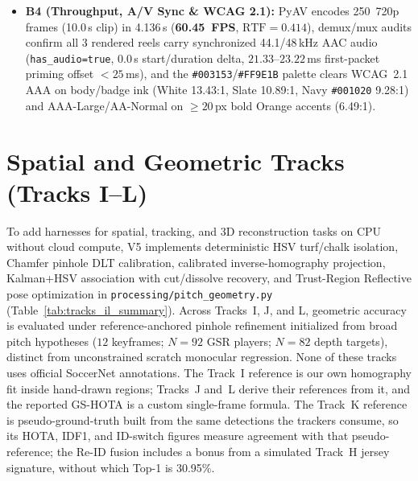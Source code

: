 \documentclass[10pt,twocolumn,letterpaper]{article}
\begin{document}
\begin{itemize}
    \item \textbf{B4 (Throughput, A/V Sync \& WCAG 2.1):} PyAV encodes 250~720p frames (10.0\,s clip) in 4.136\,s (\textbf{60.45~FPS}, $\text{RTF}=0.414$), demux/mux audits confirm all 3 rendered reels carry synchronized 44.1/48\,kHz AAC audio (\texttt{has\_audio=true}, $0.0$\,s start/duration delta, $21.33\text{--}23.22$\,ms first-packet priming offset $<25$\,ms), and the \texttt{\#003153}/\texttt{\#FF9E1B} palette clears WCAG~2.1 AAA on body/badge ink (White 13.43:1, Slate 10.89:1, Navy \texttt{\#001020} 9.28:1) and AAA-Large/AA-Normal on $\ge 20$\,px bold Orange accents (6.49:1).
\end{itemize}

\section{Spatial and Geometric Tracks (Tracks I--L)}
\label{sec:spatial_tracks}

To add harnesses for spatial, tracking, and 3D reconstruction tasks on CPU without cloud compute, V5 implements deterministic HSV turf/chalk isolation, Chamfer pinhole DLT calibration, calibrated inverse-homography projection, Kalman+HSV association with cut/dissolve recovery, and Trust-Region Reflective pose optimization in \texttt{processing/pitch\_geometry.py} (Table~\ref{tab:tracks_il_summary}). Across Tracks~I, J, and L, geometric accuracy is evaluated under reference-anchored pinhole refinement initialized from broad pitch hypotheses ($12$ keyframes; $N=92$ GSR players; $N=82$ depth targets), distinct from unconstrained scratch monocular regression. None of these tracks uses official SoccerNet annotations. The Track~I reference is our own homography fit inside hand-drawn regions; Tracks~J and~L derive their references from it, and the reported GS-HOTA is a custom single-frame formula. The Track~K reference is pseudo-ground-truth built from the same detections the trackers consume, so its HOTA, IDF1, and ID-switch figures measure agreement with that pseudo-reference; the Re-ID fusion includes a bonus from a simulated Track~H jersey signature, without which Top-1 is 30.95\%.
\end{document}

